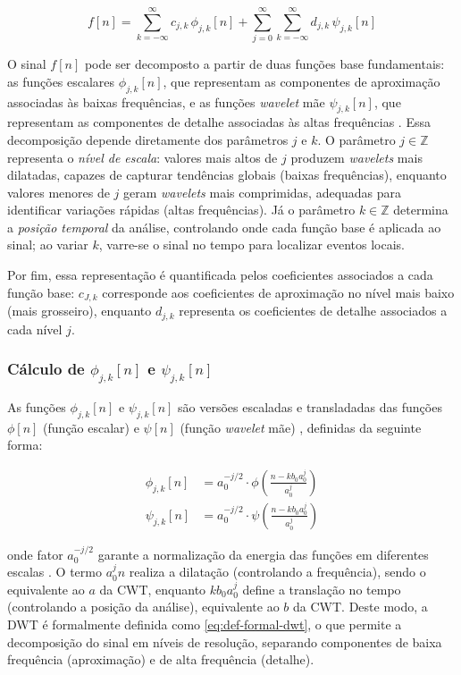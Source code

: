 \begin{equation}
f[n] = \sum_{k=-\infty}^{\infty} c_{j,k} \, \phi_{j,k}[n] + \sum_{j=0}^{\infty} \sum_{k=-\infty}^{\infty} d_{j,k} \, \psi_{j,k}[n]
\label{eq:dwt-series}
\end{equation}

O sinal $f[n]$ pode ser decomposto a partir de duas funções base fundamentais: as funções escalares $\phi_{j,k}[n]$, que representam as componentes de aproximação associadas às baixas frequências, e as funções \textit{wavelet} mãe $\psi_{j,k}[n]$, que representam as componentes de detalhe associadas às altas frequências \Cite{PassigSilva2022}.
Essa decomposição depende diretamente dos parâmetros $j$ e $k$. O parâmetro $j \in \mathbb{Z}$ representa o \textit{nível de escala}: valores mais altos de $j$ produzem \textit{wavelets} mais dilatadas, capazes de capturar tendências globais (baixas frequências), enquanto valores menores de $j$ geram \textit{wavelets} mais comprimidas, adequadas para identificar variações rápidas (altas frequências). Já o parâmetro $k \in \mathbb{Z}$ determina a \textit{posição temporal} da análise, controlando onde cada função base é aplicada ao sinal; ao variar $k$, varre-se o sinal no tempo para localizar eventos locais.

Por fim, essa representação é quantificada pelos coeficientes associados a cada função base: $c_{J,k}$ corresponde aos coeficientes de aproximação no nível mais baixo (mais grosseiro), enquanto $d_{j,k}$ representa os coeficientes de detalhe associados a cada nível $j$.


\subsubsection*{Cálculo de $\phi_{j,k}[n]$ e $\psi_{j,k}[n]$}

As funções \( \phi_{j,k}[n] \) e \( \psi_{j,k}[n] \) são versões escaladas e transladadas das funções \( \phi[n] \) (função escalar) e \( \psi[n] \) (função \textit{wavelet} mãe) \cite{PassigSilva2022}, definidas da seguinte forma:

\begin{align}
\phi_{j,k}[n] &= a_0^{-j/2} \cdot \phi\left( \frac{n - k b_0 a_0^j}{a_0^j} \right) \\
\psi_{j,k}[n] &= a_0^{-j/2} \cdot \psi\left( \frac{n - k b_0 a_0^j}{a_0^j} \right)
\end{align}

\noindent 
onde fator \( a_0^{-j/2} \) garante a normalização da energia das funções em diferentes escalas \cite{Goswami1999}. O termo \( a_0^j n \) realiza a dilatação (controlando a frequência), sendo o equivalente ao \(a\) da CWT, enquanto \( k b_0 a_0^j\) define a translação no tempo (controlando a posição da análise), equivalente ao \(b\) da CWT. Deste modo, a DWT é formalmente definida como \autoref{eq:def-formal-dwt}, o que permite a decomposição do sinal em níveis de resolução, separando componentes de baixa frequência (aproximação) e de alta frequência (detalhe).



